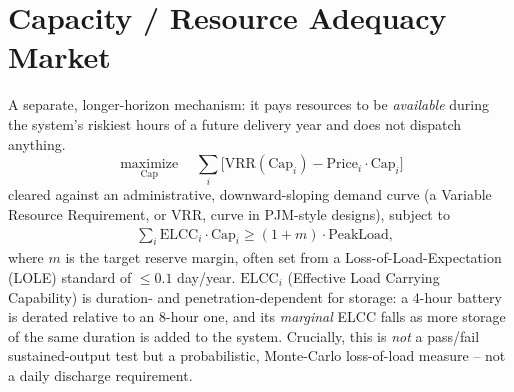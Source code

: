 \documentclass[10pt,conference]{IEEEtran}
\newcommand{\maximize}{\operatorname*{maximize}}
\begin{document}
\section{Capacity / Resource Adequacy Market}
A separate, longer-horizon mechanism: it pays resources to be \emph{available} during
the system's riskiest hours of a future delivery year and does not dispatch anything.
\begin{equation}
\maximize_{\mathrm{Cap}} \quad \sum_i \Big[\mathrm{VRR}(\mathrm{Cap}_i) - \mathrm{Price}_i \cdot \mathrm{Cap}_i\Big]
\end{equation}
cleared against an administrative, downward-sloping demand curve (a Variable Resource
Requirement, or VRR, curve in PJM-style designs), subject to
\begin{align*}
&\textstyle\sum_i \mathrm{ELCC}_i \cdot \mathrm{Cap}_i \ge (1+m)\cdot\mathrm{PeakLoad}, \tag{a}
\end{align*}
where $m$ is the target reserve margin, often set from a Loss-of-Load-Expectation (LOLE)
standard of $\le 0.1$ day/year. $\mathrm{ELCC}_i$ (Effective Load Carrying Capability) is
duration- and penetration-dependent for storage: a 4-hour battery is derated relative to
an 8-hour one, and its \emph{marginal} ELCC falls as more storage of the same duration is
added to the system. Crucially, this is \emph{not} a pass/fail sustained-output test but a
probabilistic, Monte-Carlo loss-of-load measure -- not a daily discharge requirement.
\end{document}
